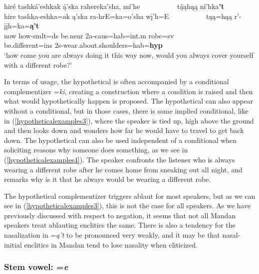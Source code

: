 \begin{exe}
\begin{xlist}
	\item\label{hypotheticalexamples4}
	\glll hiré tashká'eshkak ą́'ska rahereka'sha, mí'he ~ ~ ~ ~ ~  ~ tą́ąhąą ní'hka\textbf{'t}\\
	hire tashka-eshka=ak ą'ska ra-hrE=ka=o'sha wį'h=E ~ ~ ~ ~ ~ ~ tąą=hąą r'-įįh=ka=\textbf{ą't}\\
	\textnormal{now} \textnormal{how}-smlt=ds \textnormal{be.near} 2a-caus=hab=int.m \textnormal{robe}=sv ~ ~ ~ ~ ~ ~  \textnormal{be.different}=ins 2s-\textnormal{wear.about.shoulders}=hab=\textbf{hyp}\\
	\glt `how come you are always doing it this way now, would you always cover yourself with a different robe?' \citep[240]{hollow1973b}
	
	\end{xlist}

\end{exe}

In terms of usage, the hypothetical is often accompanied by a conditional complementizer =\textit{ki}, creating a construction where a condition is raised and then what would hypothetically happen is proposed. The hypothetical can also appear without a conditional, but in those cases, there is some implied conditional, like in (\ref{hypotheticalexamples3}), where the speaker is tied up, high above the ground and then looks down and wonders how far he would have to travel to get back down. The hypothetical can also be used independent of a conditional when soliciting reasons why someone does something, as we see in (\ref{hypotheticalexamples4}). The speaker confronts the listener who is always wearing a different robe after he comes home from sneaking out all night, and remarks why is it that he always would be wearing a different robe.

The hypothetical complementizer triggers ablaut for most speakers, but as we can see in (\ref{hypotheticalexamples3}), this is not the case for all speakers. As we have previously discussed with respect to negation, it seems that not all Mandan speakers treat ablauting enclitics the same. There is also a tendency for the nasalization in =\textit{ą't} to be pronounced very weakly, and it may be that nasal-initial enclitics in Mandan tend to lose nasality when cliticized.

\subsubsection{Stem vowel: =\textit{e}}\label{stemvowel}

